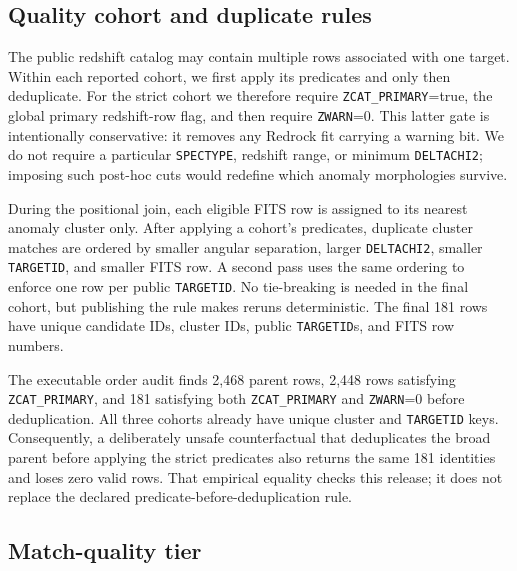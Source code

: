 \documentclass[twocolumn]{aastex701}
\begin{document}
\subsection{Quality cohort and duplicate rules}\label{sec:quality-selection}

The public redshift catalog may contain multiple rows associated with one target.  Within each
reported cohort, we first apply its predicates and only then deduplicate.  For the strict cohort
we therefore require \texttt{ZCAT\_PRIMARY}=true, the global primary redshift-row flag, and then
require
\texttt{ZWARN}=0.  This latter gate is intentionally conservative: it removes any Redrock fit
carrying a warning bit.  We do not require a particular \texttt{SPECTYPE}, redshift range, or
minimum \texttt{DELTACHI2}; imposing such post-hoc cuts would redefine which anomaly morphologies
survive.

During the positional join, each eligible FITS row is assigned to its nearest anomaly cluster
only.  After applying a cohort's predicates, duplicate cluster matches are ordered by smaller angular separation, larger
\texttt{DELTACHI2}, smaller \texttt{TARGETID}, and smaller FITS row.  A second pass uses the same
ordering to enforce one row per public \texttt{TARGETID}.  No tie-breaking is needed in the final
cohort, but publishing the rule makes reruns deterministic.  The final 181 rows have unique
candidate IDs, cluster IDs, public \texttt{TARGETID}s, and FITS row numbers.

The executable order audit finds 2,468 parent rows, 2,448 rows satisfying
\texttt{ZCAT\_PRIMARY}, and 181 satisfying both \texttt{ZCAT\_PRIMARY} and
\texttt{ZWARN}=0 before deduplication.  All three cohorts already have unique cluster and
\texttt{TARGETID} keys.  Consequently, a deliberately unsafe counterfactual that deduplicates the
broad parent before applying the strict predicates also returns the same 181 identities and loses
zero valid rows.  That empirical equality checks this release; it does not replace the declared
predicate-before-deduplication rule.

\subsection{Match-quality tier}\label{sec:match-tier}
\end{document}
